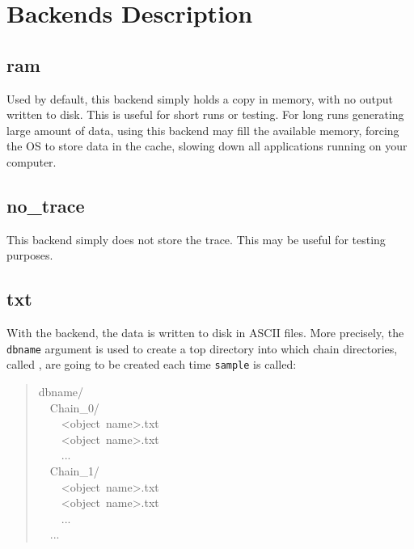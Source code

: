 
\hypertarget{backends-description}{}
\section*{Backends Description}
\label{backends-description}



\hypertarget{ram}{}
\subsection*{ram}
\label{ram}

Used by default, this backend simply holds a copy in memory, with no output written to disk. This is useful for short runs or testing. For long runs generating large amount of data, using this backend may fill the available memory, forcing the OS to store data in the cache, slowing down all applications running on your computer.




\hypertarget{no-trace}{}
\subsection*{no{\_}trace}
\label{no-trace}

This backend simply does not store the trace. This may be useful for testing
purposes.



\hypertarget{txt}{}
\subsection*{txt}
\label{txt}

With the  backend, the data is written to disk in ASCII files.
More precisely, the \texttt{dbname} argument is used to create a top directory
into which chain directories, called , are going to be created each
time \texttt{sample} is called:
\begin{quote}{\ttfamily \raggedright \noindent
dbname/~\\
~~Chain{\_}0/~\\
~~~~<object~name>.txt~\\
~~~~<object~name>.txt~\\
~~~~...~\\
~~Chain{\_}1/~\\
~~~~<object~name>.txt~\\
~~~~<object~name>.txt~\\
~~~~...~\\
~~...
}\end{quote}

